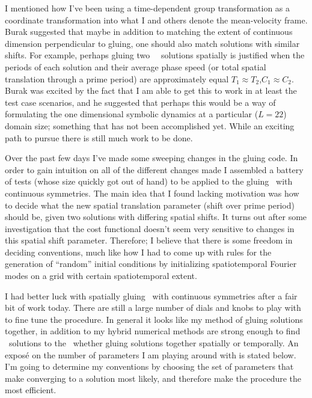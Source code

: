 \begin{description}
{\begin{description}
I mentioned how I've been using a time-dependent group transformation as a coordinate transformation into
what I and others denote the mean-velocity frame. Burak suggested that maybe in addition to matching the
extent of continuous dimension perpendicular to gluing, one should also match solutions with similar
shifts. For example, perhaps gluing two \rpo\ \twot\ solutions spatially is justified when the periods
of each solution and their average phase speed (or total spatial translation through a prime
period) are approximately equal $T_1 \approx T_2$,$C_1 \approx C_2$. Burak was excited by the fact
that I am able to get this to work in at least the test case scenarios, and he suggested that perhaps this
would be a way of formulating the one dimensional symbolic dynamics at a particular ($L=22$) domain size;
something that has not been accomplished yet. While an exciting path to pursue there is still much work to be done.
\item[Spatiotemp gluing]
Over the past few days I've made some sweeping changes in the gluing code. In order to gain intuition on all
of the different changes made I assembled a battery of tests (whose size quickly got out of hand) to be applied
to the gluing \twots\ with continuous symmetries. The main idea that I found lacking motivation was how to decide
what the new spatial translation parameter (shift over prime period) should be, given two solutions with differing
spatial shifts. It turns out after some investigation that the cost functional doesn't seem very sensitive to
changes in this spatial shift parameter. Therefore; I believe that there is some freedom in deciding conventions,
much like how I had to come up with rules for the generation of ``random'' initial conditions by initializing
spatiotemporal Fourier modes on a grid with certain spatiotemporal extent.

I had better luck with spatially gluing \twots\ with continuous symmetries after a fair bit of work today.
There are still a large number of dials and knobs to play with to fine tune the procedure. In general it looks
like my method of gluing solutions together, in addition to my hybrid numerical methods are strong enough to
find \twot\ solutions to the \KSe\ whether gluing solutions together spatially or temporally. An expos\'e
on the number of parameters I am playing around with is stated below. I'm going to determine my conventions
by choosing the set of parameters that make converging to a solution most likely, and therefore make
the procedure the most efficient.


\end{description}}
\end{description}

